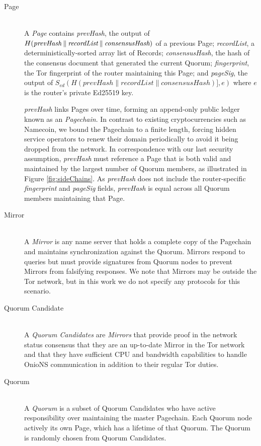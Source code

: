 \documentclass{sig-alternate}
\newcommand*\concat{\mathbin{\|}}
\begin{document}
\begin{description}
	\item[Page] \hfill \\
		A \emph{Page} contains \emph{prevHash}, the output of $ H(\emph{prevHash} \concat \emph{recordList} \concat \emph{consensusHash}) $ of a previous Page; \emph{recordList}, a deterministically-sorted array list of Records; \emph{consensusHash}, the hash of the consensus document that generated the current Quorum; \emph{fingerprint}, the Tor fingerprint of the router maintaining this Page; and \emph{pageSig}, the output of $ S_{\mathit{ed}}(H(\mathit{prevHash} \concat \mathit{recordList} \concat \mathit{consensusHash})], e) $ where $ e $ is the router's private Ed25519 key.
		
		\emph{prevHash} links Pages over time, forming an append-only public ledger known as an \emph{Pagechain}. In contrast to existing cryptocurrencies such as Namecoin, we bound the Pagechain to a finite length, forcing hidden service operators to renew their domain periodically to avoid it being dropped from the network. In correspondence with our last security assumption, \emph{prevHash} must reference a Page that is both valid and maintained by the largest number of Quorum members, as illustrated in Figure \ref{fig:sideChains}. As \emph{prevHash} does not include the router-specific \emph{fingerprint} and \emph{pageSig} fields, \emph{prevHash} is equal across all Quorum members maintaining that Page.

	\item[Mirror] \hfill \\
		A \emph{Mirror} is any name server that holds a complete copy of the Pagechain and maintains synchronization against the Quorum. Mirrors respond to queries but must provide signatures from Quorum nodes to prevent Mirrors from falsifying responses. We note that Mirrors may be outside the Tor network, but in this work we do not specify any protocols for this scenario.

	\item[Quorum Candidate] \hfill \\
		A \emph{Quorum Candidates} are \emph{Mirrors} that provide proof in the network status consensus that they are an up-to-date Mirror in the Tor network and that they have sufficient CPU and bandwidth capabilities to handle OnioNS communication in addition to their regular Tor duties.

	\item[Quorum] \hfill \\
		A \emph{Quorum} is a subset of Quorum Candidates who have active responsibility over maintaining the master Pagechain. Each Quorum node actively its own Page, which has a lifetime of that Quorum. The Quorum is randomly chosen from Quorum Candidates.
\end{description}
\end{document}
